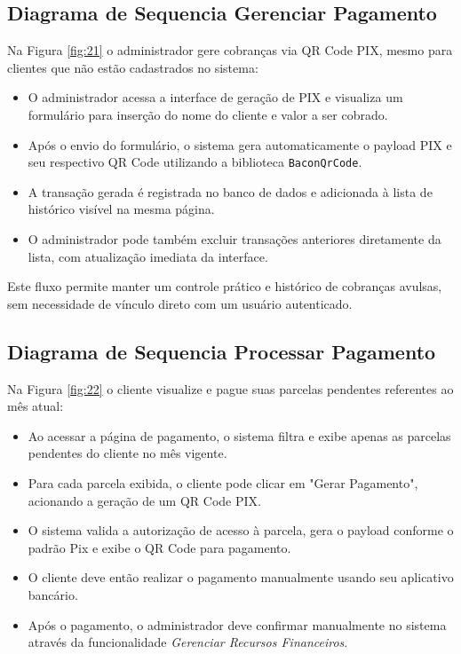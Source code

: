 \subsection{Diagrama de Sequencia Gerenciar Pagamento}

Na Figura \ref{fig:21} o administrador gere cobranças via QR Code PIX, mesmo para clientes que não estão cadastrados no sistema:

\begin{itemize} \item O administrador acessa a interface de geração de PIX e visualiza um formulário para inserção do nome do cliente e valor a ser cobrado. \item Após o envio do formulário, o sistema gera automaticamente o payload PIX e seu respectivo QR Code utilizando a biblioteca \texttt{BaconQrCode}. \item A transação gerada é registrada no banco de dados e adicionada à lista de histórico visível na mesma página. \item O administrador pode também excluir transações anteriores diretamente da lista, com atualização imediata da interface. \end{itemize}
Este fluxo permite manter um controle prático e histórico de cobranças avulsas, sem necessidade de vínculo direto com um usuário autenticado.

\subsection{Diagrama de Sequencia Processar Pagamento}

Na Figura \ref{fig:22} o cliente visualize e pague suas parcelas pendentes referentes ao mês atual:

\begin{itemize} \item Ao acessar a página de pagamento, o sistema filtra e exibe apenas as parcelas pendentes do cliente no mês vigente. \item Para cada parcela exibida, o cliente pode clicar em "Gerar Pagamento", acionando a geração de um QR Code PIX. \item O sistema valida a autorização de acesso à parcela, gera o payload conforme o padrão Pix e exibe o QR Code para pagamento. \item O cliente deve então realizar o pagamento manualmente usando seu aplicativo bancário. \item Após o pagamento, o administrador deve confirmar manualmente no sistema através da funcionalidade \textit{Gerenciar Recursos Financeiros}. \end{itemize}

